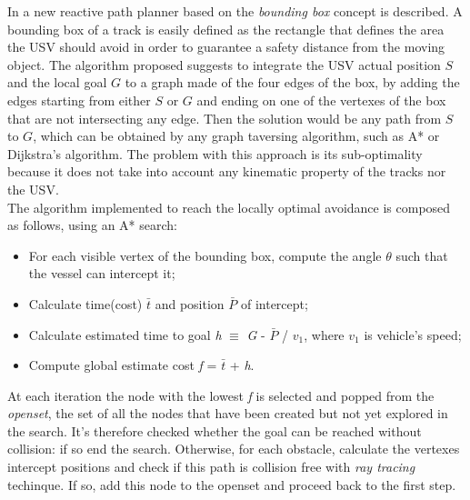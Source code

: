 \documentclass[12pt]{article}
\begin{document}
              \indent In \parencite{Casalino2009} a new reactive path planner based on the \textit{bounding box} concept is described. A bounding box of a track is easily defined as the rectangle that defines the area the USV should avoid in order to guarantee a safety distance from the moving object. The algorithm proposed suggests to integrate the USV actual position $S$ and the local goal $G$ to a graph made of the four edges of the box, by adding the edges starting from either $S$ or $G$ and ending on one of the vertexes of the box that are not intersecting any edge. Then the solution would be any path from $S$ to $G$, which can be obtained by any graph taversing algorithm, such as A* or Dijkstra's algorithm. The problem with this approach is its sub-optimality because it does not take into account any kinematic property of the tracks nor the USV.\\
              The algorithm implemented to reach the locally optimal avoidance is composed as follows, using an A* search:
                    \begin{itemize}
                          \item For each visible vertex of the bounding box, compute the angle $\theta$ such that the vessel can intercept it;
                          \item Calculate time(cost) \textit{$\bar{t}$} and position $\bar{P}$ of intercept;
                          \item Calculate estimated time to goal \textit{h} $\equiv$ \textit{G} - \textit{$\bar{P}$} / \textit{$v_1$}, where \textit{$v_1$} is vehicle's speed;
                          \item Compute global estimate cost \textit{f} = \textit{$\bar{t}$} + \textit{h}.
                    \end{itemize}
              At each iteration the node with the lowest \textit{f} is selected and popped from the \textit{openset}, the set of all the nodes that have been created but not yet explored in the search. It's therefore checked whether the goal can be reached without collision: if so end the search. Otherwise, for each obstacle, calculate the vertexes intercept positions and check if this path is collision free with \textit{ray tracing} techinque. If so, add this node to the openset and proceed back to the first step.
\end{document}

